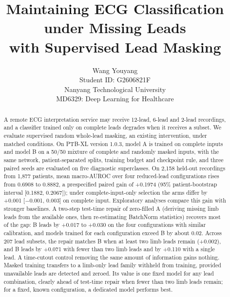 \documentclass{article}
\title{Maintaining ECG Classification under Missing Leads\\with Supervised Lead Masking}
\author{Wang Youyang\\Student ID: G2606821F\\Nanyang Technological University\\MD6329: Deep Learning for Healthcare}
\begin{document}

\setcounter{page}{1}
\maketitle
\begin{abstract}
A remote ECG interpretation service may receive 12-lead, 6-lead and 2-lead recordings, and a classifier trained only on complete leads degrades when it receives a subset. We evaluate supervised random whole-lead masking, an existing intervention, under matched conditions. On PTB-XL version 1.0.3, model A is trained on complete inputs and model B on a 50/50 mixture of complete and randomly masked inputs, with the same network, patient-separated splits, training budget and checkpoint rule, and three paired seeds are evaluated on five diagnostic superclasses. On 2,158 held-out recordings from 1,877 patients, mean macro-AUROC over four reduced-lead configurations rises from 0.6908 to 0.8882, a prespecified paired gain of +0.1974 (95\% patient-bootstrap interval [0.1882, 0.2067]); under complete-input-only selection the arms differ by +0.001 [$-$0.001, 0.003] on complete input. Exploratory analyses compare this gain with stronger baselines. A two-step test-time repair of zero-filled A (deriving missing limb leads from the available ones, then re-estimating BatchNorm statistics) recovers most of the gap: B leads by +0.017 to +0.030 on the four configurations with similar calibration, and models trained for each configuration exceed B by about 0.02. Across 207 lead subsets, the repair matches B when at least two limb leads remain (+0.002), and B leads by +0.071 with fewer than two limb leads and by +0.110 with a single lead. A time-cutout control removing the same amount of information gains nothing. Masked training transfers to a limb-only lead family withheld from training, provided unavailable leads are detected and zeroed. Its value is one fixed model for any lead combination, clearly ahead of test-time repair when fewer than two limb leads remain; for a fixed, known configuration, a dedicated model performs best.
\end{abstract}

\begingroup
{}


\endgroup

\end{document}
